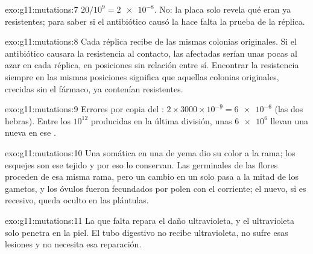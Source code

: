 \begin{solution}{exo:g11:mutations:7}
$20/10^9 = \num{2e-8}$. No: la placa solo revela qué  eran ya
resistentes; para saber si el antibiótico causó la  hace falta
la prueba de la réplica.
\end{solution}

\begin{solution}{exo:g11:mutations:8}
Cada réplica recibe  de las mismas colonias originales. Si el
antibiótico causara la resistencia al contacto, las  afectadas
serían unas pocas al azar en cada réplica, en posiciones sin relación
entre sí. Encontrar la resistencia siempre en las mismas posiciones
significa que aquellas colonias originales, crecidas sin el fármaco, ya
contenían  resistentes.
\end{solution}

\begin{solution}{exo:g11:mutations:9}
Errores por copia del : $2 \times 3000 \times 10^{-9} =
\num{6e-6}$ (las dos hebras). Entre los $10^{12}$  producidas en
la última división, unas $\num{6e6}$ llevan una  nueva en ese
.
\end{solution}

\begin{solution}{exo:g11:mutations:10}
Una  somática en una  de yema dio su color a la rama; los
esquejes son ese tejido y por eso lo conservan. Las  germinales
de las flores proceden de esa misma rama, pero un cambio en un 
solo pasa a la mitad de los gametos, y los óvulos fueron fecundados por
polen con el  corriente; el  nuevo, si es recesivo, queda
oculto en las plántulas.
\end{solution}

\begin{solution}{exo:g11:mutations:11}
La  que falta repara el daño ultravioleta, y el ultravioleta solo
penetra en la piel. El tubo digestivo no recibe ultravioleta, no sufre
esas lesiones y no necesita esa reparación.
\end{solution}

